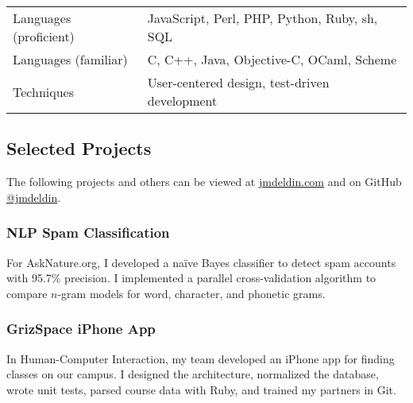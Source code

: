 \documentclass[10pt]{xecv}
\begin{document}
\begin{paracol}{2}
\begin{tabularx}{\columnwidth}{@{}l X@{}}
  Languages (proficient) & JavaScript, Perl, PHP, Python, Ruby, sh, SQL \\
  Languages (familiar) &  C, C++, Java, Objective-C, OCaml, Scheme \\
  Techniques & User-centered design, test-driven development \\
\end{tabularx}

  \switchcolumn
  \footnotesize


  \subsection*{Selected Projects}
  The following projects and others can be viewed at
  \href{http://www.jmdeldin.com/?utm_source=cv&utm_medium=pdf&utm_content=otherproj&utm_campaign=cv-otherproj}{jmdeldin.com}
  and on GitHub
  \href{https://github.com/jmdeldin}{@jmdeldin}.

  \subsubsection*{NLP Spam Classification}
  For AskNature.org, I developed a na\"{i}ve Bayes classifier to detect spam
  accounts with 95.7\% precision. I implemented a parallel
  cross-validation algorithm to compare $n$-gram models for word,
  character, and phonetic grams.

  \subsubsection*{GrizSpace iPhone App}
  In Human-Computer Interaction, my team developed an iPhone app for finding
  classes on our campus. I designed the architecture, normalized the database,
  wrote unit tests, parsed course data with Ruby, and trained my partners in
  Git.


\end{paracol}
\end{document}

